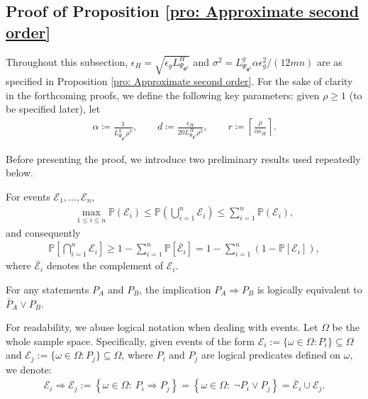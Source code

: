 \documentclass{siamart251216}
\begin{document}
\subsection{Proof of Proposition \ref{pro: Approximate second order}}
Throughout this subsection, $\epsilon_H=\sqrt{\epsilon_gL_{\Psi_{\boldsymbol{\theta}^{0}}}^{H}}$ and $\sigma^{2}=L_{\Psi_{\boldsymbol{\theta}^{0}}}^{g}\alpha\epsilon_g^{2}/(12mn)$ are as specified in Proposition \ref{pro: Approximate second order}.
For the sake of clarity in the forthcoming proofs, we define the following key parameters: given $\rho \ge 1$ (to be specified later), let 
\begin{gather}
    \label{eq: parameters}
    \alpha\coloneqq\frac{1}{L_{\Psi_{\boldsymbol{\theta}^{0}}}^{g}\rho^{7}},
    \qquad
    d\coloneqq\frac{\epsilon_H}{20L_{\Psi_{\boldsymbol{\theta}^{0}}}^{H}\rho^{2}},
    \qquad
    r\coloneqq\left\lceil\frac{\rho}{\alpha\epsilon_H}\right\rceil .
\end{gather}

Before presenting the proof, we introduce two preliminary results used repeatedly below.

\begin{proposition}
\label{pro: Boole-frechet Inequality}
    For events $\mathcal{E}_1,\ldots,\mathcal{E}_n$,
    \begin{gather*}
        \max_{1\leq i\leq n}\mathbb{P}(\mathcal{E}_i)\leq\mathbb{P}\left(\bigcup_{i=1}^{n}\mathcal{E}_i\right)\leq\sum_{i=1}^{n}\mathbb{P}(\mathcal{E}_i),
    \end{gather*}
    and consequently
    \begin{gather}
    \label{eq: Boole's inequality}
        \mathbb{P}\left[\bigcap_{i=1}^{n}\mathcal{E}_i\right]\geq1-\sum_{i=1}^{n}\mathbb{P}[\bar{\mathcal{E}}_i]=1-\sum_{i=1}^{n}\left(1-\mathbb{P}[\mathcal{E}_i]\right),
    \end{gather}
    where $\bar{\mathcal{E}}_i$ denotes the complement of $\mathcal{E}_i$.
\end{proposition}

    \begin{proposition}
    \label{pro: Material implication}
    For any statements $P_A$ and $P_B$, the implication $P_A\Rightarrow P_B$ is logically equivalent to $\bar{P}_A\lor P_B$.
\end{proposition}

For readability, we abuse logical notation when dealing with events. Let $\Omega$ be the whole sample space. Specifically, given events of the form $\mathcal{E}_{i} := \{\omega \in \Omega : P_{i}\} \subseteq \Omega$ and $\mathcal{E}_{j} := \{\omega \in \Omega : P_{j}\} \subseteq \Omega$, where $P_{i}$ and $P_{j}$ are logical predicates defined on $\omega$, we denote:
\begin{gather}
\label{eq: Material implication}
    \mathcal{E}_{i} \Rightarrow \mathcal{E}_{j} := \left\{ \omega \in \Omega :~P_{i} \Rightarrow P_{j} \right\} = \left\{ \omega \in \Omega :~\neg P_{i} \lor P_{j} \right\} = \bar{\mathcal{E}}_{i} \cup \mathcal{E}_{j}.
\end{gather}
\end{document}
